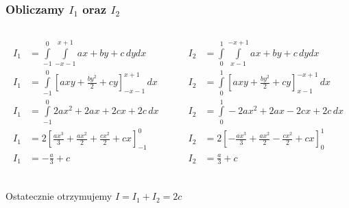 \documentclass[9pt]{beamer}
\begin{document}
    \begin{frame}
        \frametitle{Obliczamy $I_1$ oraz $I_2$}
        \begin{columns}
            \begin{column}{0.6\textwidth}
                \begin{align*}
                    I_1 &= \int\limits_{-1}^{0}\int\limits_{-x-1}^{x+1} ax+by+c \,dydx \\
                    I_1 &= \int\limits_{-1}^{0}\left[axy + \frac{by^2}{2} + cy\right]_{-x-1}^{x+1} \,dx \\
                    I_1 &= \int\limits_{-1}^{0} 2ax^2 + 2ax + 2cx + 2c \,dx \\
                    I_1 &= 2\left[ \frac{ax^3}{3} + \frac{ax^2}{2} + \frac{cx^2}{2} + cx \right]_{-1}^{0} \\
                    I_1 &= -\frac{a}{3} + c \\
                \end{align*}
            \end{column}
            \begin{column}{0.6\textwidth}
                \begin{align*}
                    I_2 &= \int\limits_{0}^{1}\int\limits_{x-1}^{-x+1} ax+by+c \,dydx \\
                    I_2 &= \int\limits_{0}^{1}\left[axy + \frac{by^2}{2} + cy\right]_{x-1}^{-x+1} \,dx \\
                    I_2 &= \int\limits_{0}^{1} - 2ax^2 + 2ax - 2cx + 2c \,dx \\
                    I_2 &= 2\left[ -\frac{ax^3}{3} + \frac{ax^2}{2} - \frac{cx^2}{2} + cx \right]_{0}^{1} \\
                    I_2 &= \frac{a}{3} + c \\
                \end{align*}
            \end{column}
        \end{columns}

        \begin{center}
            Ostatecznie otrzymujemy $ I = I_1 + I_2 = 2c $
        \end{center}

    \end{frame}
\end{document}
